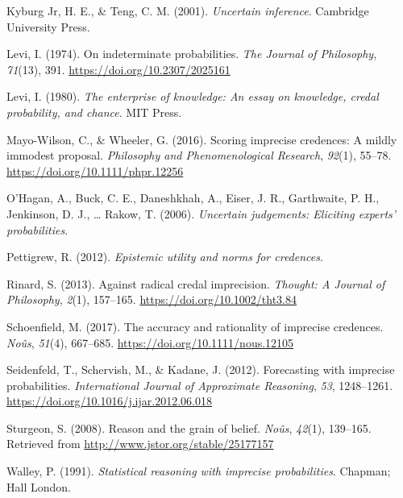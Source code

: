 \documentclass[
  letterpaper,
  DIV=11,
  numbers=noendperiod]{scrartcl}
\newlength{\cslhangindent}
\newlength{\cslentryspacingunit} %
\newenvironment{CSLReferences}[2] %
 {%
  \setlength{\parindent}{0pt}
  \ifodd #1
  \let\oldpar\par
  \def\par{\hangindent=\cslhangindent\oldpar}
  \fi
  \setlength{\parskip}{#2\cslentryspacingunit}
 }%
 {}
\begin{document}
\begin{CSLReferences}{1}{0}
\leavevmode{}%
Kyburg Jr, H. E., \& Teng, C. M. (2001). \emph{Uncertain inference}.
Cambridge University Press.

\leavevmode{}%
Levi, I. (1974). On indeterminate probabilities. \emph{The Journal of
Philosophy}, \emph{71}(13), 391. \url{https://doi.org/10.2307/2025161}

\leavevmode{}%
Levi, I. (1980). \emph{The enterprise of knowledge: An essay on
knowledge, credal probability, and chance}. MIT Press.

\leavevmode{}%
Mayo-Wilson, C., \& Wheeler, G. (2016). Scoring imprecise credences: A
mildly immodest proposal. \emph{Philosophy and Phenomenological
Research}, \emph{92}(1), 55--78.
\url{https://doi.org/10.1111/phpr.12256}

\leavevmode{}%
O'Hagan, A., Buck, C. E., Daneshkhah, A., Eiser, J. R., Garthwaite, P.
H., Jenkinson, D. J., \ldots{} Rakow, T. (2006). \emph{Uncertain
judgements: Eliciting experts' probabilities}.

\leavevmode{}%
Pettigrew, R. (2012). \emph{Epistemic utility and norms for credences}.

\leavevmode{}%
Rinard, S. (2013). Against radical credal imprecision. \emph{Thought: A
Journal of Philosophy}, \emph{2}(1), 157--165.
\url{https://doi.org/10.1002/tht3.84}

\leavevmode{}%
Schoenfield, M. (2017). The accuracy and rationality of imprecise
credences. \emph{Noûs}, \emph{51}(4), 667--685.
\url{https://doi.org/10.1111/nous.12105}

\leavevmode{}%
Seidenfeld, T., Schervish, M., \& Kadane, J. (2012). Forecasting with
imprecise probabilities. \emph{International Journal of Approximate
Reasoning}, \emph{53}, 1248--1261.
\url{https://doi.org/10.1016/j.ijar.2012.06.018}

\leavevmode{}%
Sturgeon, S. (2008). Reason and the grain of belief. \emph{No{û}s},
\emph{42}(1), 139--165. Retrieved from
\url{http://www.jstor.org/stable/25177157}

\leavevmode{}%
Walley, P. (1991). \emph{Statistical reasoning with imprecise
probabilities}. Chapman; Hall London.

\end{CSLReferences}
\end{document}
